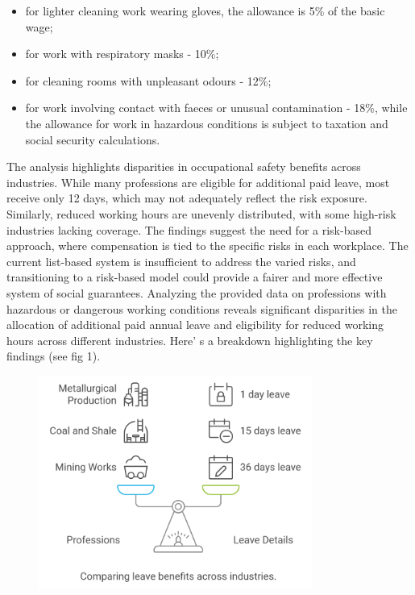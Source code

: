 \begin{itemize}
\item
  for lighter cleaning work wearing gloves, the allowance is 5\% of the
  basic wage;
\item
  for work with respiratory masks - 10\%;
\item
  for cleaning rooms with unpleasant odours - 12\%;
\item
  for work involving contact with faeces or unusual contamination -
  18\%, while the allowance for work in hazardous conditions is subject
  to taxation and social security calculations.
\end{itemize}

The analysis highlights disparities in occupational safety benefits
across industries. While many professions are eligible for additional
paid leave, most receive only 12 days, which may not adequately reflect
the risk exposure. Similarly, reduced working hours are unevenly
distributed, with some high-risk industries lacking coverage. The
findings suggest the need for a risk-based approach, where compensation
is tied to the specific risks in each workplace. The current list-based
system is insufficient to address the varied risks, and transitioning to
a risk-based model could provide a fairer and more effective system of
social guarantees. Analyzing the provided data on professions with
hazardous or dangerous working conditions reveals significant
disparities in the allocation of additional paid annual leave and
eligibility for reduced working hours across different industries.
Here' s a breakdown highlighting the key findings (see
fig 1).

\begin{figure}[H]
	\centering
	\includegraphics[width=0.8\textwidth]{media/gorn/image2}
	\caption*{}
\end{figure}


